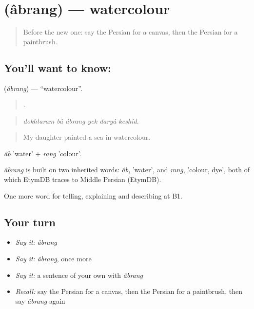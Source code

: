 \section[\texorpdfstring{\fa{آبرنگ} (âbrang)}{آبرنگ (âbrang)}]{ (âbrang) — watercolour}

\label{lesson:FA-C525-abrang}



\begin{quote}
Before the new one: say the Persian for a canvas, then the Persian for a paintbrush.
\end{quote}

\subsection*{You'll want to know: }
\textbf{} (\emph{âbrang}) — \textquotedblleft{}watercolour\textquotedblright{}.

\begin{quote}
     .
\end{quote}

\begin{quote}
\emph{dokhtaram bâ âbrang yek daryâ keshid.}
\end{quote}

\begin{quote}
My daughter painted a sea in watercolour.
\end{quote}

\emph{âb} 'water' + \emph{rang} 'colour'.

\begin{cousinweb}
\emph{âbrang} is built on two inherited words: \emph{âb}, 'water', and \emph{rang}, 'colour, dye', both of which EtymDB traces to Middle Persian (EtymDB).
\end{cousinweb}

\begin{grammarlens}[title={What you've built}]
One more word for telling, explaining and describing at B1.
\end{grammarlens}

\subsection*{Your turn}
\begin{itemize}
\raggedright
  \item \emph{Say it:} \emph{âbrang}
  \item \emph{Say it:} \emph{âbrang}, once more
  \item \emph{Say it:} a sentence of your own with \emph{âbrang}
  \item \emph{Recall:} say the Persian for a canvas, then the Persian for a paintbrush, then say \emph{âbrang} again
\end{itemize}

